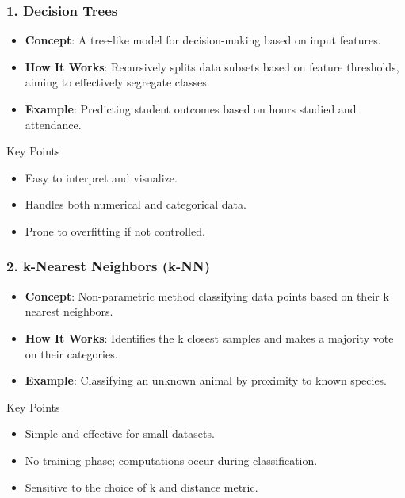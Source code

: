 \documentclass[aspectratio=169]{beamer}
\begin{document}
\begin{frame}[fragile]
    \frametitle{1. Decision Trees}
    \begin{itemize}
        \item \textbf{Concept}: A tree-like model for decision-making based on input features.
        \item \textbf{How It Works}: Recursively splits data subsets based on feature thresholds, aiming to effectively segregate classes.
        \item \textbf{Example}: Predicting student outcomes based on hours studied and attendance.
    \end{itemize}
    \begin{block}{Key Points}
        \begin{itemize}
            \item Easy to interpret and visualize.
            \item Handles both numerical and categorical data.
            \item Prone to overfitting if not controlled.
        \end{itemize}
    \end{block}
\end{frame}

\begin{frame}[fragile]
    \frametitle{2. k-Nearest Neighbors (k-NN)}
    \begin{itemize}
        \item \textbf{Concept}: Non-parametric method classifying data points based on their k nearest neighbors.
        \item \textbf{How It Works}: Identifies the k closest samples and makes a majority vote on their categories.
        \item \textbf{Example}: Classifying an unknown animal by proximity to known species.
    \end{itemize}
    \begin{block}{Key Points}
        \begin{itemize}
            \item Simple and effective for small datasets.
            \item No training phase; computations occur during classification.
            \item Sensitive to the choice of k and distance metric.
        \end{itemize}
    \end{block}
\end{frame}
\end{document}
